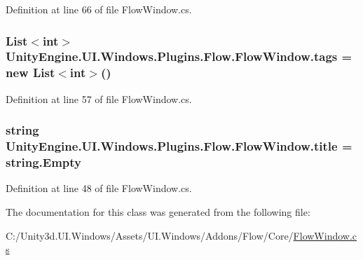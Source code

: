 Definition at line 66 of file Flow\+Window.\+cs.

\hypertarget{class_unity_engine_1_1_u_i_1_1_windows_1_1_plugins_1_1_flow_1_1_flow_window_a720e730b77875db8a5adcc30aed7cc17}{}
\subsubsection[{tags}]{\setlength{\rightskip}{0pt plus 5cm}List$<$int$>$ Unity\+Engine.\+U\+I.\+Windows.\+Plugins.\+Flow.\+Flow\+Window.\+tags = new List$<$int$>$()}\label{class_unity_engine_1_1_u_i_1_1_windows_1_1_plugins_1_1_flow_1_1_flow_window_a720e730b77875db8a5adcc30aed7cc17}


Definition at line 57 of file Flow\+Window.\+cs.

\hypertarget{class_unity_engine_1_1_u_i_1_1_windows_1_1_plugins_1_1_flow_1_1_flow_window_a322584712da381ed07d866ec70b62d9d}{}
\subsubsection[{title}]{\setlength{\rightskip}{0pt plus 5cm}string Unity\+Engine.\+U\+I.\+Windows.\+Plugins.\+Flow.\+Flow\+Window.\+title = string.\+Empty}\label{class_unity_engine_1_1_u_i_1_1_windows_1_1_plugins_1_1_flow_1_1_flow_window_a322584712da381ed07d866ec70b62d9d}


Definition at line 48 of file Flow\+Window.\+cs.



The documentation for this class was generated from the following file\+:\begin{DoxyCompactItemize}
\item 
C\+:/\+Unity3d.\+U\+I.\+Windows/\+Assets/\+U\+I.\+Windows/\+Addons/\+Flow/\+Core/\hyperlink{_flow_window_8cs}{Flow\+Window.\+cs}\end{DoxyCompactItemize}
